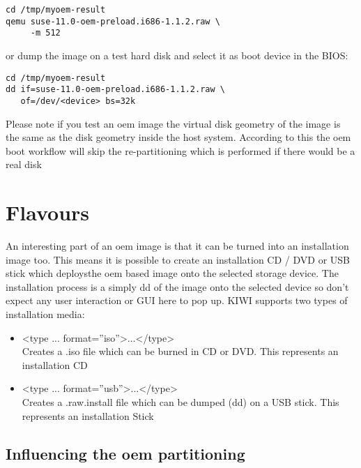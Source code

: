 \begin{Command}{12cm}
\begin{verbatim}
cd /tmp/myoem-result
qemu suse-11.0-oem-preload.i686-1.1.2.raw \
     -m 512
\end{verbatim}
\end{Command}

or dump the image on a test hard disk and select it as boot device
in the BIOS:

\begin{Command}{12cm}
\begin{verbatim}
cd /tmp/myoem-result
dd if=suse-11.0-oem-preload.i686-1.1.2.raw \
   of=/dev/<device> bs=32k
\end{verbatim}
\end{Command}

Please note if you test an oem image the virtual disk geometry of the
image is the same as the disk geometry inside the host system. According
to this the oem boot workflow will skip the re-partitioning which is
performed if there would be a real disk

\section{Flavours}

An interesting part of an oem image is that it can be turned into
an installation image too. This means it is possible to create an
installation CD / DVD or USB stick which deploysthe oem based
image onto the selected storage device. The installation process
is a simply dd of the image onto the selected device so don't
expect any user interaction or GUI here to pop up. KIWI supports
two types of installation media:

\begin{itemize}
\item <type ... format=''iso''>...</type>\\
      Creates a .iso file which can be burned in CD or DVD. This
      represents an installation CD
\item <type ... format=''usb''>...</type>\\
      Creates a .raw.install file which can be dumped (dd) on a
      USB stick. This represents an installation Stick
\end{itemize}

\subsection{Influencing the oem partitioning}

